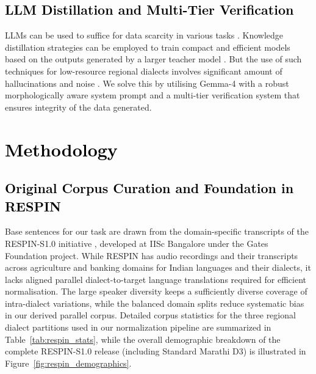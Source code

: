 \documentclass[11pt, a4paper]{article}
\begin{document}
\subsection{\textcolor{black}{LLM Distillation and Multi-Tier Verification}}
LLMs can be used to suffice for data scarcity in various tasks \citep{wang2022selfinstruct,taori2023alpaca,mukherjee2023orca}. Knowledge distillation strategies can be employed to train compact and efficient models based on the outputs generated by a larger teacher model \citep{ho2023distilling,pecher2023better,degibert2024scaling}. But the use of such techniques for low-resource regional dialects involves significant amount of hallucinations and noise \citep{degibert2024scaling,ji2023survey}. We solve this by utilising Gemma-4 \citep{gemma2024} with a robust morphologically aware system prompt and a multi-tier verification system that ensures integrity of the data generated.

\section{\textcolor{black}{Methodology}}
\label{sec:methodology}

\subsection{\textcolor{black}{Original Corpus Curation and Foundation in RESPIN}}
Base sentences for our task are drawn from the domain-specific transcripts of the RESPIN-S1.0 initiative \citep{kumar2025respin}, developed at IISc Bangalore under the Gates Foundation project. While RESPIN has audio recordings and their transcripts across agriculture and banking domains for Indian languages and their dialects, it lacks aligned parallel dialect-to-target language translations required for efficient normalisation. The large speaker diversity keeps a sufficiently diverse coverage of intra-dialect variations, while the balanced domain splits reduce systematic bias in our derived parallel corpus. Detailed corpus statistics for the three regional dialect partitions used in our normalization pipeline are summarized in Table~\ref{tab:respin_stats}, while the overall demographic breakdown of the complete RESPIN-S1.0 release (including Standard Marathi D3) is illustrated in Figure~\ref{fig:respin_demographics}.
\end{document}

